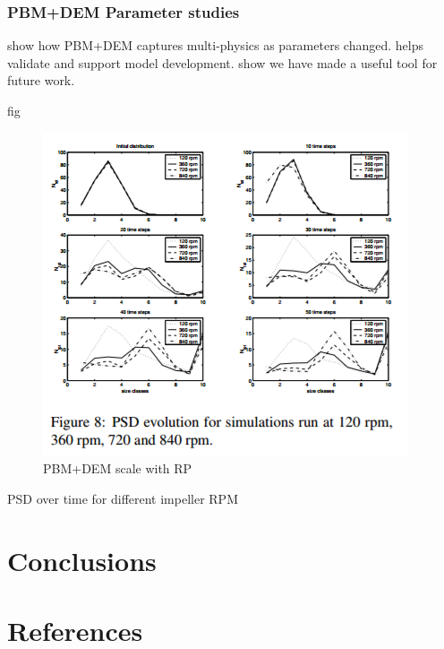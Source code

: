 \documentclass[preprint,11pt,authoryear]{elsarticle}
\begin{document}
   \subsubsection{PBM+DEM Parameter studies}
   \par show how PBM+DEM captures multi-physics as parameters changed. helps validate and support model development. show we have made a useful tool for future work.
   \par fig 
      \begin{figure}[H]
      \centering
      \includegraphics[scale=0.7]{rslts_psd_evo_time}
      \caption{PBM+DEM scale with RP}
      \label{fig:rslts_psd_evo_time}
      \end{figure}
   \par PSD over time for different impeller RPM
    
\section{Conclusions}

\section*{References} 


\end{document}
